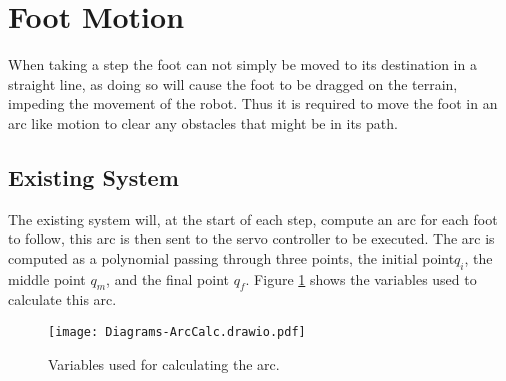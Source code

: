         \newpage
    \section{Foot Motion} \label{sec:arc_generation}
        When taking a step the foot can not simply be moved to its destination in a straight line, as doing so will cause the foot to be dragged on the terrain,
        impeding the movement of the robot. Thus it is required to move the foot in an arc like motion to clear any obstacles that might be in its path.


        \subsection{Existing System}
            The existing system will, at the start of each step, compute an arc for each foot to follow, this arc is then sent to the servo controller
            to be executed. The arc is computed as a polynomial passing through three points, the initial point\(q_i\), the middle point \(q_m\), and the final point \(q_f\).
            Figure \ref{fig:old_arc_vars} shows the variables used to calculate this arc.
            \begin{figure}[h]
                \centering
                \texttt{[image: Diagrams-ArcCalc.drawio.pdf]}
                \caption{Variables used for calculating the arc.}
                \label{fig:old_arc_vars}
            \end{figure}



